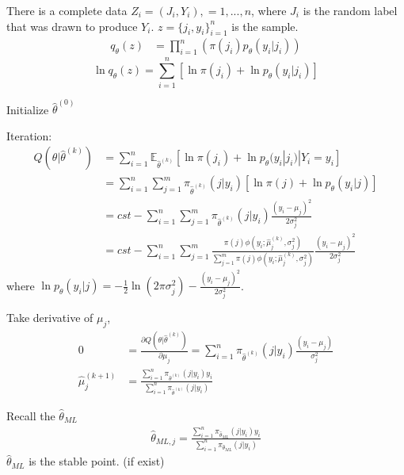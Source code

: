 \documentclass[11pt]{elegantbook}
\begin{document}
There is a complete data $Z_i=(J_i,Y_i),=1,...,n$, where $J_i$ is the random label that was drawn to produce $Y_i$. $z=\{j_i,y_i\}_{i=1}^n$ is the sample.
\begin{equation}
    \begin{aligned}
        q_\theta(z)&=\prod_{i=1}^n\left(\pi(j_i)p_\theta(y_i|j_i)\right)
    \end{aligned}
    \nonumber
\end{equation}
$$\ln q_{\theta}(z)=\sum_{i=1}^n[\ln \pi(j_i)+\ln p_{\theta}(y_i|j_i)]$$

Initialize $\hat{\theta}^{(0)}$

Iteration:
\begin{equation}
    \begin{aligned}
        Q(\theta|\hat{\theta}^{(k)})
        &=\sum_{i=1}^n\mathbb{E}_{\hat{\theta}^{(k)}}[\ln \pi(j_i)+\ln p_{\theta}(y_i|j_i)|Y_i=y_i]\\
        &=\sum_{i=1}^n\sum_{j=1}^m\pi_{\hat{\theta}^{(k)}}(j|y_i)[\ln \pi(j)+\ln p_{\theta}(y_i|j)]\\
        &=cst-\sum_{i=1}^n\sum_{j=1}^m\pi_{\hat{\theta}^{(k)}}(j|y_i)\frac{(y_i-\mu_j)^2}{2\sigma_j^2}\\
        &=cst-\sum_{i=1}^n\sum_{j=1}^m\frac{\pi(j)\phi(y_i ; \hat{\mu}_j^{(k)}, \sigma_j^2)}{\sum_{j=1}^m\pi(j)\phi(y_i ; \hat{\mu}_j^{(k)}, \sigma_j^2)}\frac{(y_i-\mu_j)^2}{2\sigma_j^2}
    \end{aligned}
    \nonumber
\end{equation}
where $\ln p_{\theta}(y_i|j)=-\frac{1}{2}\ln(2\pi\sigma_j^2)-\frac{(y_i-\mu_j)^2}{2\sigma_j^2}$.

Take derivative of $\mu_j$,
\begin{equation}
    \begin{aligned}
        0&=\frac{\partial Q(\theta|\hat{\theta}^{(k)})}{\partial \mu_j}=\sum_{i=1}^n\pi_{\hat{\theta}^{(k)}}(j|y_i)\frac{(y_i-\mu_j)}{\sigma_j^2}\\
        \hat{\mu}_j^{(k+1)}&=\frac{\sum_{i=1}^n\pi_{\hat{\theta}^{(k)}}(j|y_i)y_i}{\sum_{i=1}^n\pi_{\hat{\theta}^{(k)}}(j|y_i)}
    \end{aligned}
    \nonumber
\end{equation}

Recall the $\hat{\theta}_{ML}$
\begin{equation}
    \begin{aligned}
        \hat{\theta}_{ML,j}=\frac{\sum_{i=1}^n\pi_{\hat{\theta}_{ML}}(j|y_i)y_i}{\sum_{i=1}^n\pi_{\hat{\theta}_{ML}}(j|y_i)}
    \end{aligned}
    \nonumber
\end{equation}
$\hat{\theta}_{ML}$ is the stable point. (if exist)
\end{document}
